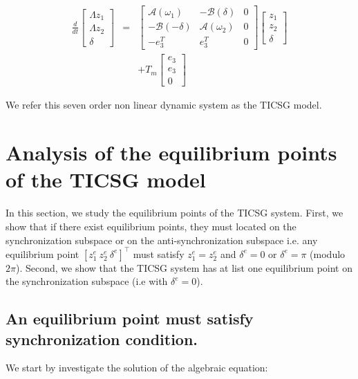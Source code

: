\documentclass[conference]{IEEEtran}
\begin{document}
\begin{equation}
\begin{array}{ccc}
\frac{d}{dt}\left[\begin{array}{c}
\varLambda z_{1}\\
\varLambda z_{2}\\
\delta
\end{array}\right] & = & \left[\begin{array}{c|c|c}
\mathcal{A}(\omega_{1}) & -\mathcal{B}(\delta) & 0\\
\hline -\mathcal{B}(-\delta) & \mathcal{A}(\omega_{2}) & 0\\
\hline -e_{3}^{T} & e_{3}^{T} & 0
\end{array}\right]\left[\begin{array}{c}
z_{1}\\
z_{2}\\
\delta
\end{array}\right]\\
 &  & +T_{m}\left[\begin{array}{c}
e_{3}\\
e_{3}\\
0
\end{array}\right]
\end{array}\label{eq:TICSGDynamics}
\end{equation}

We refer this seven order non linear dynamic system as the TICSG model.

\section{Analysis of the equilibrium points of the TICSG model \label{sec:equivalence_pont}}

In this section, we study the equilibrium points of the TICSG system. First, we show that  if there exist equilibrium points, they must located on the synchronization subspace or on the anti-synchronization subspace i.e. any equilibrium point $\left[z_1^e \ z_2^e \ \delta^e \right]^\top$ must satisfy $z_1^e=z_2^e$ and $\delta^e=0$ or $\delta^e = \pi$   (modulo $2\pi$). Second, we show that the TICSG system has at list one equilibrium point on the synchronization subspace (i.e with $\delta^e=0$).

\subsection{An equilibrium point must satisfy synchronization condition.}
We  start by investigate the solution of the algebraic equation:  
\end{document}
